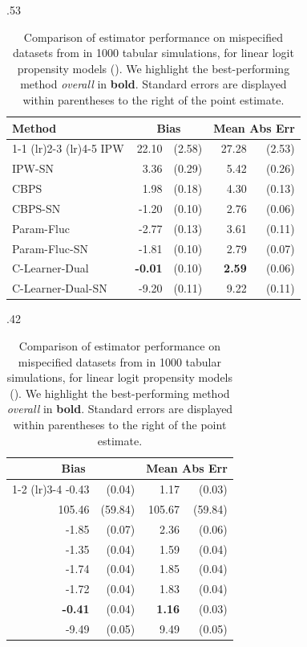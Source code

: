 \begin{table}[t]
\footnotesize
\centering
\hfill
\begin{subtable}{.53\linewidth}
\centering
\caption{$N=200$} %
\begin{tabular}{lrrrr}
\toprule
 Method & \multicolumn{2}{c}{Bias} & \multicolumn{2}{c}{Mean Abs Err} \\
\cmidrule(lr){1-1}
\cmidrule(lr){2-3}
\cmidrule(lr){4-5}
IPW & 22.10 & (2.58) & 27.28 & (2.53) \\
IPW-SN & 3.36 & (0.29) & 5.42 & (0.26)\\
CBPS & 1.98 & (0.18) & 4.30 & (0.13)\\
CBPS-SN & -1.20 & (0.10) & 2.76 & (0.06)\\
Param-Fluc & -2.77 & (0.13) & 3.61 & (0.11) \\
Param-Fluc-SN & -1.81 & (0.10) & 2.79 & (0.07) \\
C-Learner-Dual & \textbf{-0.01} & (0.10) & \textbf{2.59} & (0.06) \\
C-Learner-Dual-SN & -9.20 & (0.11) & 9.22 & (0.11) \\
\bottomrule
\end{tabular}
\end{subtable}
\hspace{-1.15em}
\begin{subtable}{.42\linewidth}
\centering
\caption{$N=1000$} %
\begin{tabular}{rrrr}
\toprule
 \multicolumn{2}{c}{Bias} & \multicolumn{2}{c}{Mean Abs Err} \\
\cmidrule(lr){1-2}
\cmidrule(lr){3-4}
-0.43 & (0.04) & 1.17 & (0.03)\\
 105.46 & (59.84) & 105.67 & (59.84) \\
  -1.85 & (0.07) & 2.36 & (0.06) \\
   -1.35 & (0.04) & 1.59 & (0.04) \\
-1.74 & (0.04) & 1.85 & (0.04) \\
-1.72 & (0.04) & 1.83 & (0.04) \\
\textbf{-0.41} & (0.04) & \textbf{1.16} & (0.03) \\
-9.49 & (0.05) & 9.49 & (0.05) \\
\bottomrule
\end{tabular}
\end{subtable}
\hfill
\hspace*{\fill}
\caption{%
Comparison of estimator performance on mispecified datasets from \citet{KangSc07} in 1000 tabular simulations, for linear logit propensity models (). %
We highlight the best-performing method \emph{overall} in \textbf{bold}. Standard errors are displayed within parentheses to the right of the point estimate.
}
    \label{tb:linear_ipw}
\end{table}

\label{sec:ks_ipw-end}

\ifdefined\response\newpage\newpage\clearpage\pagebreak\else\fi
